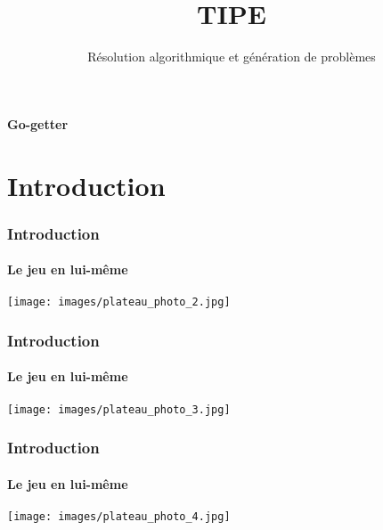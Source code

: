 \documentclass{beamer}
\title{TIPE }
\author{} %
\institute{}
\date{Résolution algorithmique et génération de problèmes}
\begin{document}
\begin{frame}
        \titlepage
		\begin{center}
			\color{marine_blue}\textbf{Go-getter}
		\end{center}
\end{frame}


\section{Introduction}

\begin{frame}
    \frametitle{Introduction}
    \framesubtitle{Le jeu en lui-même}
    \begin{center}
    	\texttt{[image: images/plateau\_photo\_2.jpg]}
    \end{center}
   

\end{frame}
\begin{frame}
    \frametitle{Introduction}
    \framesubtitle{Le jeu en lui-même}
    \begin{center}
    	\texttt{[image: images/plateau\_photo\_3.jpg]} 
    \end{center}
   

\end{frame}

\begin{frame}
    \frametitle{Introduction}
    \framesubtitle{Le jeu en lui-même}
    \begin{center}
    	\texttt{[image: images/plateau\_photo\_4.jpg]} 
    \end{center}
   

\end{frame}
\end{document}
